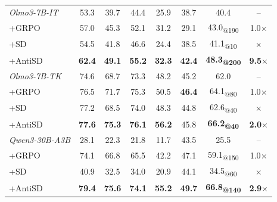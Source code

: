 \begin{table}[ht]
\begin{tabular}{l|c c c c c|c|c}
    \midrule
    \textit{Olmo3-7B-IT}               & 53.3            & 39.7            & 44.4            & 25.9            & 38.7             & 40.4                              & --                    \\
    \quad +GRPO                        & 57.0            & 45.3            & 52.1            & 31.2            & 29.1             & 43.0\textsubscript{@190}          & 1.0$\times$           \\
    \quad +SD                          & 54.5            & 41.8            & 46.6            & 24.4            & 38.5             & 41.1\textsubscript{@10}           & $\times$              \\
    \rowcolor{antisdrow} \quad +AntiSD & \textbf{62.4}   & \textbf{49.1}   & \textbf{55.2}   & \textbf{32.3}   & \textbf{42.4}    & \textbf{48.3\textsubscript{@200}} & \textbf{9.5$\times$}  \\
    \midrule
    \textit{Olmo3-7B-TK}               & 74.6            & 68.7            & 73.3            & 48.2            & 45.2             & 62.0                              & --                    \\
    \quad +GRPO                        & 76.5            & 71.7            & 75.3            & 50.5            & \textbf{46.4}    & 64.1\textsubscript{@80}           & 1.0$\times$           \\
    \quad +SD                          & 77.2            & 68.5            & 74.0            & 48.3            & 44.8             & 62.6\textsubscript{@40}           & $\times$              \\
    \rowcolor{antisdrow} \quad +AntiSD & \textbf{77.6}   & \textbf{75.3}   & \textbf{76.1}   & \textbf{56.2}   & 45.8             & \textbf{66.2\textsubscript{@40}}  & \textbf{2.0$\times$}  \\
    \midrule
    \textit{Qwen3-30B-A3B}             & 28.1            & 22.3            & 21.8            & 11.7            & 43.5             & 25.5                              & --                    \\
    \quad +GRPO                        & 74.1            & 66.8            & 65.5            & 42.2            & 47.1             & 59.1\textsubscript{@150}          & 1.0$\times$           \\
    \quad +SD                          & 40.9            & 32.5            & 34.0            & 20.9            & 44.1             & 34.5\textsubscript{@60}           & $\times$              \\
    \rowcolor{antisdrow} \quad +AntiSD & \textbf{79.4}   & \textbf{75.6}   & \textbf{74.1}   & \textbf{55.2}   & \textbf{49.7}    & \textbf{66.8\textsubscript{@140}} & \textbf{2.9$\times$}  \\
    \bottomrule
  \end{tabular}
\end{table}
